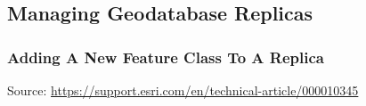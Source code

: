\documentclass[class=article , crop=false, titlepage, twoside, multi={itemize, figure, verbatim}, float=false]{standalone}
\title{}  %
\begin{document}


\ifstandalone
\maketitle %
\tableofcontents %
\clearpage
\fi

\subsection{Managing Geodatabase Replicas}
\medskip
\subsubsection[Adding A New Feature Class To A Replica]{\Large Adding A New Feature Class To A Replica}
Source:
\href{https://support.esri.com/en/technical-article/000010345}{https://support.esri.com/en/technical-article/000010345}
\end{document}
